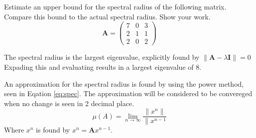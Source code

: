 Estimate an upper bound for the spectral radius of the following matrix. Compare this bound to the actual spectral radius. Show your work.
\begin{equation*}
	\boldsymbol{A}=
		\begin{pmatrix}
			7&0&3\\2&1&1\\2&0&2
		\end{pmatrix}
\end{equation*}

The spectral radius is the largest eigenvalue, explicitly found by $\|\boldsymbol{A}-\lambda \boldsymbol{I}\|=0$
Expading this and evaluating results in a largest eigenvalue of $8$.

An approximation for the spectral radius is found by using the power method, seen in Eqation \ref{eq:spec}. The approximation will be considered to be convereged when no change is seen in 2 decimal place.
\begin{equation}
	\mu\left(A\right)=\lim_{n \to \infty} \frac{\|x^n\|}{\|x^{n-1}}
	\label{eq:spec}
\end{equation}
Where $x^n$ is found by $x^n=\boldsymbol{A}x^{n-1}$.